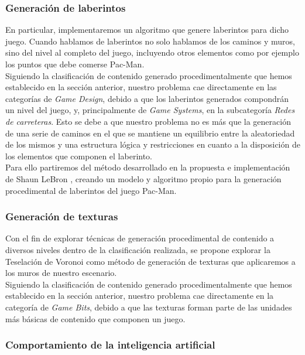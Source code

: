 \subsubsection{Generación de laberintos}

    En particular, implementaremos un algoritmo que genere laberintos para dicho juego. Cuando hablamos de laberintos no solo hablamos de los caminos y muros, sino del nivel al completo del juego, incluyendo otros elementos como por ejemplo los puntos que debe comerse Pac-Man.\\
    
    Siguiendo la clasificación de contenido generado procedimentalmente que hemos establecido en la sección anterior, nuestro problema cae directamente en las categorías de \textit{Game Design}, debido a que los laberintos generados compondrán un nivel del juego, y, principalmente de \textit{Game Systems}, en la subcategoría \textit{Redes de carreteras}. Esto se debe a que nuestro problema no es más que la generación de una serie de caminos en el que se mantiene un equilibrio entre la aleatoriedad de los mismos y una estructura lógica y restricciones en cuanto a la disposición de los elementos que componen el laberinto.\\
    
    Para ello partiremos del método desarrollado en la propuesta e implementación de Shaun LeBron \cite{lebron2012}, creando un modelo y algoritmo propio para la generación procedimental de laberintos del juego Pac-Man.

\subsubsection{Generación de texturas}

    Con el fin de explorar técnicas de generación procedimental de contenido a diversos niveles dentro de la clasificación realizada, se propone explorar la Teselación de Voronoi como método de generación de texturas que aplicaremos a los muros de nuestro escenario.\\
    
    Siguiendo la clasificación de contenido generado procedimentalmente que hemos establecido en la sección anterior, nuestro problema cae directamente en la categoría de \textit{Game Bits}, debido a que las texturas forman parte de las unidades más básicas de contenido que componen un juego.

\subsubsection{Comportamiento de la inteligencia artificial}

